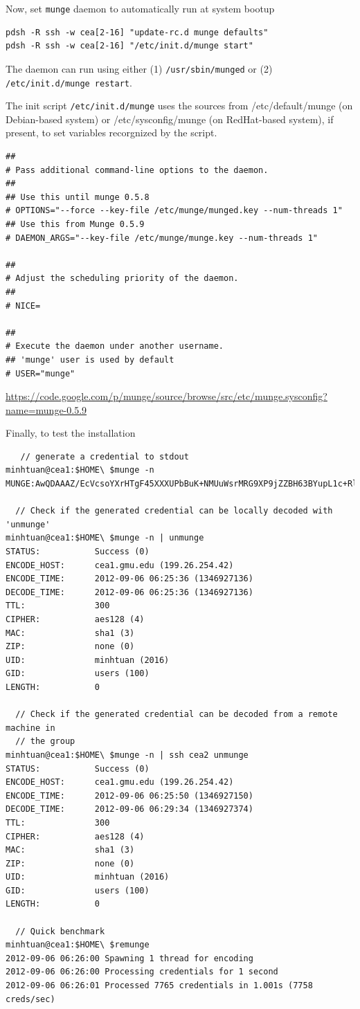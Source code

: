 Now, set \verb!munge! daemon to automatically run at system bootup
\begin{verbatim}
pdsh -R ssh -w cea[2-16] "update-rc.d munge defaults"
pdsh -R ssh -w cea[2-16] "/etc/init.d/munge start"
\end{verbatim}
The daemon can run using either (1) \verb!/usr/sbin/munged! or (2)
\verb!/etc/init.d/munge restart!.

The init script \verb!/etc/init.d/munge! uses the sources from
/etc/default/munge (on Debian-based system) or /etc/sysconfig/munge (on
RedHat-based system), if present, to set variables recorgnized by the script.
\begin{verbatim}
##
# Pass additional command-line options to the daemon.
##
## Use this until munge 0.5.8
# OPTIONS="--force --key-file /etc/munge/munged.key --num-threads 1"
## Use this from Munge 0.5.9
# DAEMON_ARGS="--key-file /etc/munge/munge.key --num-threads 1"

##
# Adjust the scheduling priority of the daemon.
##
# NICE=

##
# Execute the daemon under another username.
## 'munge' user is used by default 
# USER="munge"
\end{verbatim}
\url{https://code.google.com/p/munge/source/browse/src/etc/munge.sysconfig?name=munge-0.5.9}

Finally, to test the installation
\begin{verbatim}
   // generate a credential to stdout
minhtuan@cea1:$HOME\ $munge -n
MUNGE:AwQDAAAZ/EcVcsoYXrHTgF45XXXUPbBuK+NMUuWsrMRG9XP9jZZBH63BYupL1c+RlCoOuHM2o0eX9WGeWK/YmaYj9XHwfmSIfMwTuOOxmhz2S5GyWHtCeXY=:

  // Check if the generated credential can be locally decoded with 'unmunge'
minhtuan@cea1:$HOME\ $munge -n | unmunge
STATUS:           Success (0)
ENCODE_HOST:      cea1.gmu.edu (199.26.254.42)
ENCODE_TIME:      2012-09-06 06:25:36 (1346927136)
DECODE_TIME:      2012-09-06 06:25:36 (1346927136)
TTL:              300
CIPHER:           aes128 (4)
MAC:              sha1 (3)
ZIP:              none (0)
UID:              minhtuan (2016)
GID:              users (100)
LENGTH:           0

  // Check if the generated credential can be decoded from a remote machine in
  // the group
minhtuan@cea1:$HOME\ $munge -n | ssh cea2 unmunge
STATUS:           Success (0)
ENCODE_HOST:      cea1.gmu.edu (199.26.254.42)
ENCODE_TIME:      2012-09-06 06:25:50 (1346927150)
DECODE_TIME:      2012-09-06 06:29:34 (1346927374)
TTL:              300
CIPHER:           aes128 (4)
MAC:              sha1 (3)
ZIP:              none (0)
UID:              minhtuan (2016)
GID:              users (100)
LENGTH:           0

  // Quick benchmark
minhtuan@cea1:$HOME\ $remunge
2012-09-06 06:26:00 Spawning 1 thread for encoding
2012-09-06 06:26:00 Processing credentials for 1 second
2012-09-06 06:26:01 Processed 7765 credentials in 1.001s (7758 creds/sec)
\end{verbatim}

